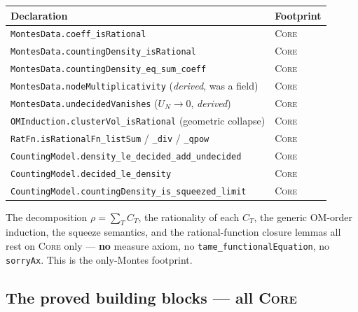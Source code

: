 \documentclass[11pt]{article}
\newcommand{\code}[1]{\texttt{#1}}
\newcommand{\Core}{\textsc{Core}}
\begin{document}
\begin{longtable}{@{}p{}p{}@{}}
\toprule
\textbf{Declaration} & \textbf{Footprint} \\
\midrule
\endhead
\code{MontesData.coeff\_isRational} & \Core \\
\code{MontesData.countingDensity\_isRational} & \Core \\
\code{MontesData.countingDensity\_eq\_sum\_coeff} & \Core \\
\code{MontesData.nodeMultiplicativity} (\emph{derived}, was a field) & \Core \\
\code{MontesData.undecidedVanishes} ($U_N\to0$, \emph{derived}) & \Core \\
\code{OMInduction.clusterVol\_isRational} (geometric collapse) & \Core \\
\code{RatFn.isRationalFn\_listSum} / \code{\_div} / \code{\_qpow} & \Core \\
\code{CountingModel.density\_le\_decided\_add\_undecided} & \Core \\
\code{CountingModel.decided\_le\_density} & \Core \\
\code{CountingModel.countingDensity\_is\_squeezed\_limit} & \Core \\
\bottomrule
\end{longtable}

\noindent The decomposition $\rho=\sum_T C_T$, the rationality of each $C_T$, the generic
OM-order induction, the squeeze semantics, and the rational-function closure lemmas all
rest on \Core{} only --- \textbf{no} measure axiom, no \code{tame\_functionalEquation},
no \code{sorryAx}. This is the only-Montes footprint.

\subsection{The proved building blocks --- all \Core}
\end{document}
